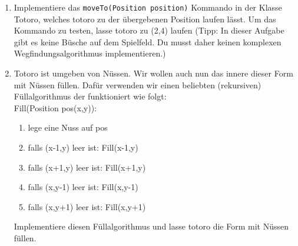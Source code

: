
\begin{enumerate}
\item Implementiere das \lstinline{moveTo(Position position)} Kommando in der Klasse Totoro, welches totoro zu der übergebenen Position laufen lässt. Um das Kommando zu testen, lasse totoro zu (2,4) laufen (Tipp: In dieser Aufgabe gibt es keine Büsche auf dem Spielfeld. Du musst daher keinen komplexen Wegfindungsalgorithmus implementieren.)
\item Totoro ist umgeben von Nüssen. Wir wollen auch nun das innere dieser Form mit Nüssen füllen. Dafür verwenden wir einen beliebten (rekursiven) Füllalgorithmus der funktioniert wie folgt:\\
Fill(Position pos(x,y)):\\
\begin{enumerate}[label=\arabic*.]
    \item lege eine Nuss auf pos
    \item falls (x-1,y) leer ist: Fill(x-1,y)
    \item falls (x+1,y) leer ist: Fill(x+1,y)
    \item falls (x,y-1) leer ist: Fill(x,y-1)
    \item falls (x,y+1) leer ist: Fill(x,y+1)
\end{enumerate}


Implementiere diesen Füllalgorithmus und lasse totoro die Form mit Nüssen füllen.
\end{enumerate}

